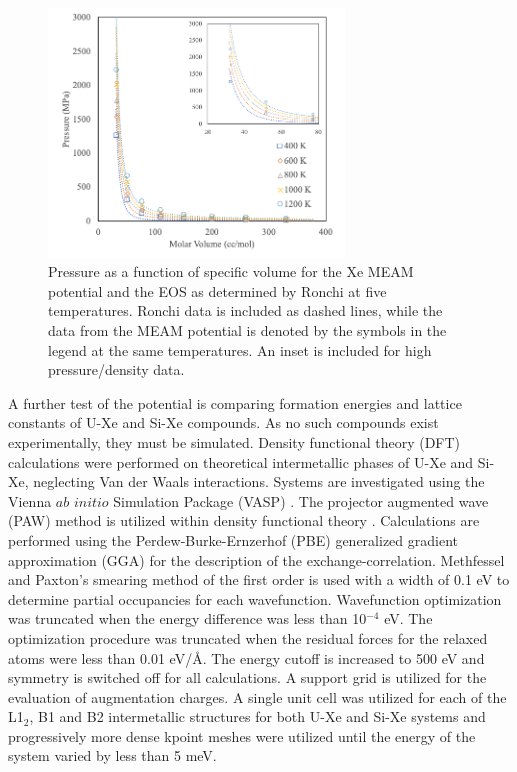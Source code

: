\documentclass[review]{elsarticle}
\providecommand{\DIFaddtex}[1]{{\protect\color{blue} \sf #1}} %
\providecommand{\DIFaddFL}[1]{\DIFadd{#1}} %
\providecommand{\DIFaddbeginFL}{} %
\providecommand{\DIFaddendFL}{} %
\providecommand{\DIFadd}[1]{\texorpdfstring{\DIFaddtex{#1}}{#1}} %
\newcommand{\DIFaddincludegraphics}[2][]{{\color{blue}\fbox{\DIFOincludegraphics[#1]{#2}}}} %
\DeclareRobustCommand{\DIFaddbeginFL}{\DIFOaddbeginFL \let\includegraphics\DIFaddincludegraphics} %
\DeclareRobustCommand{\DIFaddendFL}{\DIFOaddendFL \let\includegraphics\DIFOincludegraphics} %
\begin{document}
\begin{figure}[hbt]
	\centering
	\includegraphics[width=0.7\textwidth]{Xe_T_PvsV.png}
 \caption{Pressure as a function of specific volume for the Xe MEAM potential and the EOS as determined by Ronchi \cite{ronchi1981} at five temperatures. Ronchi data is included as dashed lines, while the data from the MEAM potential is denoted by the symbols in the legend at the same temperatures. \DIFaddbeginFL \DIFaddFL{An inset is included for high pressure/density data.}\DIFaddendFL }\label{fig:xe_eos}
\end{figure}

\FloatBarrier

A further test of the potential is comparing formation energies and lattice constants of U-Xe and Si-Xe compounds. As no such compounds exist experimentally, they must be simulated. Density functional theory (DFT) calculations were performed on theoretical intermetallic phases of U-Xe and Si-Xe, neglecting Van der Waals interactions. Systems are investigated using the Vienna $\textit{ab initio}$ Simulation Package (VASP) \cite{vasp1, vasp2, vasp3, vasp4}. The projector augmented wave (PAW) method \cite{paw1, paw2} is utilized within density functional theory \cite{dft1, dft2}. Calculations are performed using the Perdew-Burke-Ernzerhof (PBE) \cite{pbe1, pbe2} generalized gradient approximation (GGA) for the description of the exchange-correlation. Methfessel and Paxton's smearing method \cite{methfessel} of the first order is used with a width of 0.1 eV to determine partial occupancies for each wavefunction. Wavefunction optimization was truncated when the energy difference was less than 10$^{-4}$ eV. The optimization procedure was truncated when the residual forces for the relaxed atoms were less than 0.01 eV/{\AA}. The energy cutoff is increased to 500 eV and symmetry is switched off for all calculations. A support grid is utilized for the evaluation of augmentation charges. A single unit cell was utilized for each of the L1$_2$, B1 and B2 intermetallic structures for both U-Xe and Si-Xe systems and progressively more dense kpoint meshes were utilized until the energy of the system varied by less than 5 meV. 
\end{document}
